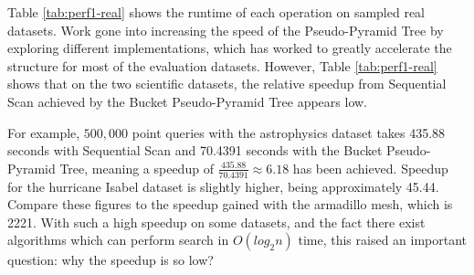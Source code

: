 \begin{table}
	\centering

	\caption{Total Execution Time (in seconds) of Each Operation on Real Datasets}
	\label{tab:perf1-real}
\end{table}

Table \ref{tab:perf1-real} shows the runtime of each operation on sampled real datasets. Work gone into increasing the speed of the Pseudo-Pyramid Tree by exploring different implementations, which has worked to greatly accelerate the structure for most of the evaluation datasets. However, Table \ref{tab:perf1-real} shows that on the two scientific datasets, the relative speedup from Sequential Scan achieved by the Bucket Pseudo-Pyramid Tree appears low.

For example, $500,000$ point queries with the astrophysics dataset takes 435.88 seconds with Sequential Scan and 70.4391 seconds with the Bucket Pseudo-Pyramid Tree, meaning a speedup of $\frac{435.88}{70.4391} \approx 6.18$ has been achieved. Speedup for the hurricane Isabel dataset is slightly higher, being approximately 45.44. Compare these figures to the speedup gained with the armadillo mesh, which is 2221. With such a high speedup on some datasets, and the fact there exist algorithms which can perform search in $O(log_2 n)$ time, this raised an important question: why the speedup is so low?

